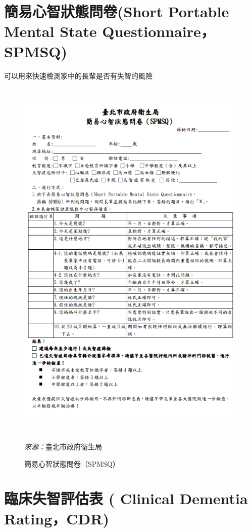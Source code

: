 \section{簡易心智狀態問卷(Short Portable Mental State Questionnaire，SPMSQ)}
可以用來快速檢測家中的長輩是否有失智的風險
\begin{figure}[H]
	\centering
	\centerline{\includegraphics[height=18cm]{pic/SPMSQ.PNG}}
	\caption{ 簡易心智狀態問卷（SPMSQ）}
	\begin{minipage}{.7\linewidth}
		\centering
		\footnotesize
		\emph{來源：}臺北市政府衛生局
	\end{minipage}
	\label{fig:SPMSQ}
\end{figure}

\section{臨床失智評估表 ( Clinical Dementia Rating，CDR)}

